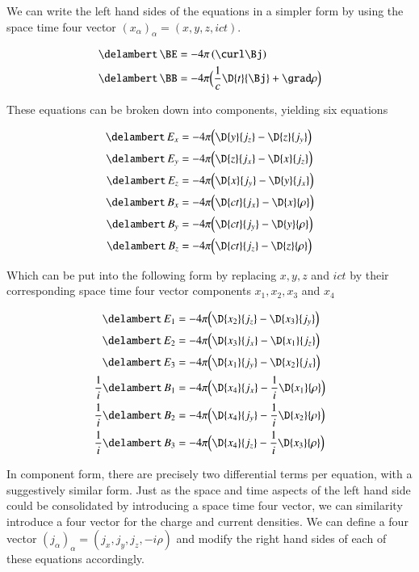 \documentclass{article}      %
\begin{document}
We can write the left hand sides of the equations in a simpler form by using the 
space time four vector $(x_\alpha)_\alpha = (x, y, z, ict)$.

\begin{align*}
\delambert \,\BE &= - 4\pi \left(\curl \Bj\right) \\
\delambert \,\BB &= - 4\pi \Bigl(\frac{1}{c} \D{t}{\Bj} + \grad \rho\Bigr)
\end{align*}

These equations 
can be broken down 
into components, yielding six equations

\begin{align*}
\delambert \,E_x &= - 4\pi \Bigl(\D{y}{j_z} - \D{z}{j_y} \Bigr) \\
\delambert \,E_y &= - 4\pi \Bigl(\D{z}{j_x} - \D{x}{j_z} \Bigr) \\
\delambert \,E_z &= - 4\pi \Bigl(\D{x}{j_y} - \D{y}{j_x} \Bigr) \\
\delambert \,B_x &= - 4\pi \Bigl(\D{ct}{j_x} - \D{x}{\rho} \Bigr)\\
\delambert \,B_y &= - 4\pi \Bigl(\D{ct}{j_y} - \D{y}{\rho} \Bigr)\\
\delambert \,B_z &= - 4\pi \Bigl(\D{ct}{j_z} - \D{z}{\rho} \Bigr)
\end{align*}

Which can be put into the following form by replacing $x, y, z$ and $ict$ by their 
corresponding space time four vector components $x_1, x_2, x_3$ and $x_4$

\begin{align*}
            \delambert \,E_1 &= - 4\pi \Bigl( \D{x_2}{j_z} -             \D{x_3}{j_y} \Bigr) \\
            \delambert \,E_2 &= - 4\pi \Bigl( \D{x_3}{j_x} -             \D{x_1}{j_z} \Bigr) \\
            \delambert \,E_3 &= - 4\pi \Bigl( \D{x_1}{j_y} -             \D{x_2}{j_x} \Bigr) \\
\frac{1}{i} \delambert \,B_1 &= - 4\pi \Bigl( \D{x_4}{j_x} - \frac{1}{i} \D{x_1}{\rho} \Bigr)\\
\frac{1}{i} \delambert \,B_2 &= - 4\pi \Bigl( \D{x_4}{j_y} - \frac{1}{i} \D{x_2}{\rho} \Bigr)\\
\frac{1}{i} \delambert \,B_3 &= - 4\pi \Bigl( \D{x_4}{j_z} - \frac{1}{i} \D{x_3}{\rho} \Bigr)
\end{align*}

In component form,
there are precisely two differential terms per equation, with a suggestively 
similar form.
Just as the space and time aspects of the left hand side could be consolidated
by introducing a space time four vector, we can similarity introduce a four 
vector for the 
charge and current densities.
We can define a four vector $(j_\alpha)_\alpha = 
(j_x, j_y, j_z, -i \rho)$ and modify the right hand sides of each of these equations 
accordingly.
\end{document}

